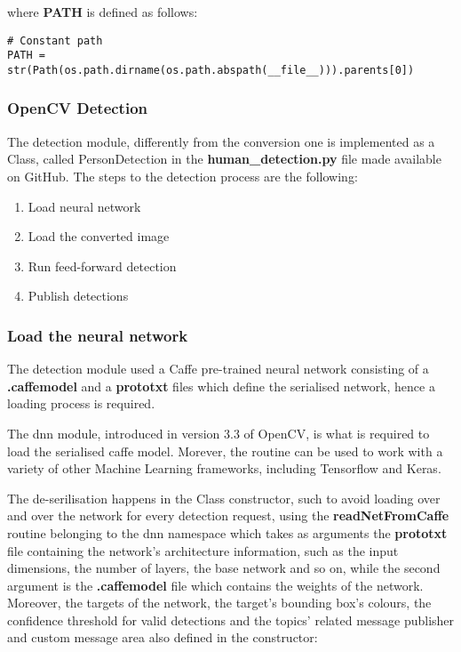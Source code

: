 where \textbf{PATH} is defined as follows:

\begin{lstlisting}
# Constant path
PATH = str(Path(os.path.dirname(os.path.abspath(__file__))).parents[0])
\end{lstlisting}

\subsubsection{OpenCV Detection}

The detection module, differently from the conversion one is implemented as a Class, called PersonDetection in the \textbf{human\_detection.py} file made available on GitHub. The steps to the detection process are the following:

\begin{enumerate}
  \item Load neural network
  \item Load the converted image
  \item Run feed-forward detection
  \item Publish detections
\end{enumerate}

\subsubsection{Load the neural network}

The detection module used a Caffe pre-trained neural network consisting of a \textbf{.caffemodel} and a \textbf{prototxt} files which define the serialised network, hence a loading process is required.

The dnn module, introduced in version 3.3 of OpenCV, is what is required to load the serialised caffe model. Morever, the routine can be used to work with a variety of other Machine Learning frameworks, including Tensorflow and Keras.

The de-serilisation happens in the Class constructor, such to avoid loading over and over the network for every detection request, using the \textbf{readNetFromCaffe} routine belonging to the dnn namespace which takes as arguments the \textbf{prototxt} file containing the network's architecture information, such as the input dimensions, the number of layers, the base network and so on, while the second argument is the \textbf{.caffemodel} file which contains the weights of the network. Moreover, the targets of the network, the target's bounding box's colours, the confidence threshold for valid detections and the topics' related message publisher and custom message area also defined in the constructor:

